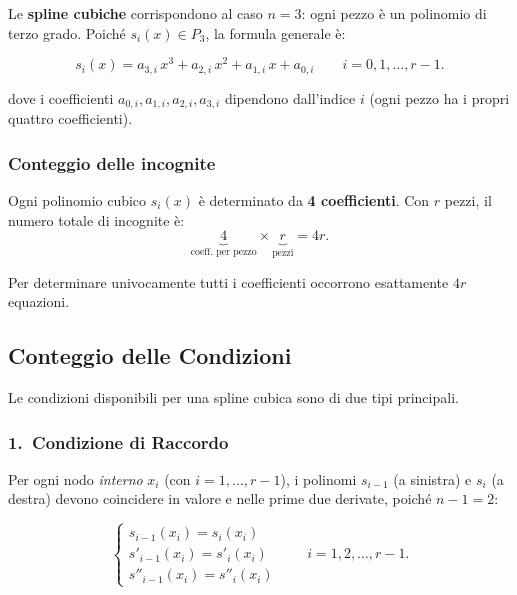 \documentclass[a4paper,12pt]{article}
\theoremstyle{definition}
\theoremstyle{remark}
\begin{document}
Le \textbf{spline cubiche} corrispondono al caso $n = 3$: ogni pezzo è un
polinomio di terzo grado. Poiché $s_i(x) \in P_3$, la formula generale è:

\begin{equation}
  \boxed{s_i(x) = a_{3,i}\,x^3 + a_{2,i}\,x^2 + a_{1,i}\,x + a_{0,i}}
  \qquad i = 0, 1, \ldots, r-1.
  \label{eq:spline-cubica}
\end{equation}

\noindent dove i coefficienti $a_{0,i}, a_{1,i}, a_{2,i}, a_{3,i}$ dipendono
dall'indice $i$ (ogni pezzo ha i propri quattro coefficienti).

\subsubsection*{Conteggio delle incognite}

Ogni polinomio cubico $s_i(x)$ è determinato da \textbf{4 coefficienti}.
Con $r$ pezzi, il numero totale di incognite è:
\[
  \underbrace{4}_{\text{coeff. per pezzo}} \times \underbrace{r}_{\text{pezzi}}
  = 4r.
\]

Per determinare univocamente tutti i coefficienti occorrono esattamente
$4r$ equazioni.

\subsection{Conteggio delle Condizioni}

Le condizioni disponibili per una spline cubica sono di due tipi principali.

\subsubsection*{1.\ Condizione di Raccordo}

Per ogni nodo \emph{interno} $x_i$ (con $i = 1, \ldots, r-1$), i polinomi
$s_{i-1}$ (a sinistra) e $s_i$ (a destra) devono coincidere in valore e nelle
prime due derivate, poiché $n - 1 = 2$:

\begin{equation}
  \begin{cases}
    s_{i-1}(x_i)   = s_i(x_i)   \\[4pt]
    s'_{i-1}(x_i)  = s'_i(x_i)  \\[4pt]
    s''_{i-1}(x_i) = s''_i(x_i)
  \end{cases}
  \qquad i = 1, 2, \ldots, r-1.
  \label{eq:raccordo-cubico}
\end{equation}
\end{document}

